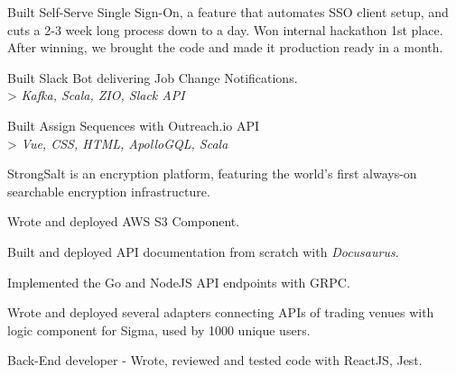 \documentclass[]{deedy-resume-openfont}
\begin{document}
\begin{minipage}[t]{0.66\textwidth}
\begin{tightemize}
\end{tightemize}
\sectionsep
{}
\vspace{\topsep} %
\begin{tightemize}
\item Built Self-Serve Single Sign-On, a feature that automates SSO client setup, and cuts a 2-3 week long process down to a day. 
Won internal hackathon 1st place. After winning, we brought the code and made it production ready in a month.
\item Built Slack Bot delivering Job Change Notifications. \\ > \emph{Kafka, Scala, ZIO, Slack API}
\item Built Assign Sequences with Outreach.io API \\ > \emph{Vue, CSS, HTML, ApolloGQL, Scala}
\end{tightemize}
\sectionsep
{}
\vspace{\topsep} %
\begin{tightemize}
\item StrongSalt is an encryption platform, featuring the world’s first always-on searchable encryption infrastructure.
\item Wrote and deployed AWS S3 Component.
\item Built and deployed API documentation from scratch with \textit{Docusaurus}.
\item Implemented the Go and NodeJS API endpoints with GRPC.
\end{tightemize}
\sectionsep
{}
\vspace{\topsep} %
\begin{tightemize}
\item Wrote and deployed several adapters connecting APIs of trading venues with logic component for Sigma, used by 1000 unique users.
\item Back-End developer - Wrote, reviewed and tested code with ReactJS, Jest.
\end{tightemize}
\sectionsep



\end{minipage}
\end{document}
